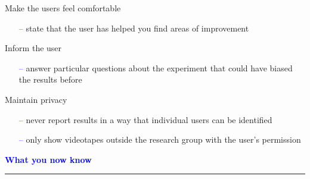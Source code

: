\documentclass[pdf]{beamer}
\begin{document}
{{{{{{{{{{{{{{{{{\begin{frame}
	{\Large Make the users feel comfortable}\par
    \begin{itemize}
		\item[\textcolor{Blue}{--}] state that the user has helped you find areas of improvement
    \end{itemize}
   \bigskip
	{\Large Inform the user}\par
    \begin{itemize}
		\item[\textcolor{Blue}{--}] answer particular questions about the experiment that could have biased the results before
    \end{itemize}	
    \bigskip
	{\Large Maintain privacy}\par
    \begin{itemize}
		\item[\textcolor{Blue}{--}] never report results in a way that individual users can be identified
		\item[\textcolor{Blue}{--}] only show videotapes outside the research group with the user’s permission
    \end{itemize}
\end{frame}



{
\begin{frame}
	\vspace{8mm}
	\textcolor{Blue}{\textbf{\large{What you now know}}}
    \textcolor{red}{\rule{10cm}{1mm}}
    

\end{frame}}}}}}}}}}}}}}}}}}}
\end{document}
